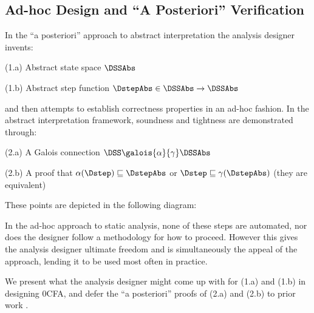 
\subsection{Ad-hoc Design and ``A Posteriori'' Verification }

In the ``a posteriori'' approach to abstract interpretation the analysis
designer invents:
%
\begin{itemizenobreak}
\item (1.a) Abstract state space $\DSSAbs$
\item (1.b) Abstract step function $\DstepAbs \in \DSSAbs \to \DSSAbs$
\end{itemizenobreak}
%
and then attempts to establish correctness properties in an ad-hoc fashion.
%
In the abstract interpretation framework, soundness and tightness are
demonstrated through:
%
\begin{itemizenobreak}
\item (2.a) A Galois connection $\DSS \galois{\alpha}{\gamma} \DSSAbs$
\item (2.b) A proof that 
      $\alpha(\Dstep) \sqsubseteq \DstepAbs$
      or
      $\Dstep \sqsubseteq \gamma(\DstepAbs)$
      (they are equivalent)
\end{itemizenobreak}
%
These points are depicted in the following diagram:
%



In the ad-hoc approach to static analysis, none of these steps are automated,
nor does the designer follow a methodology for how to proceed.
%
However this gives the analysis designer ultimate freedom and is simultaneously
the appeal of the approach, lending it to be used most often in practice.



We present what the analysis designer might come up with for (1.a) and
(1.b) in designing 0CFA, and defer the ``a posteriori'' proofs of (2.a) and
(2.b) to prior work \cite{shivers:1991:cfa, nielson:2004:program-analysis,
van-horn:2010:aam, midtgaard:2008:calculational-cfa}.


